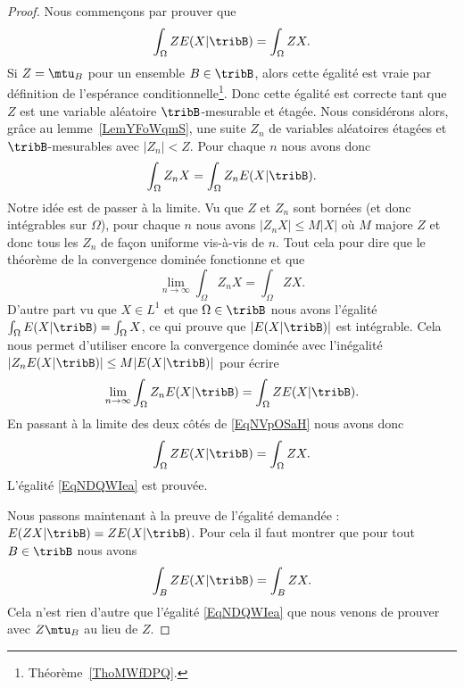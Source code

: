 \begin{proof}
	Nous commençons par prouver que
	\begin{equation}    \label{EqNDQWIea}
		\int_{\Omega}ZE(X|\tribB)=\int_{\Omega}ZX.
	\end{equation}
	Si \( Z=\mtu_B\) pour un ensemble \( B\in\tribB\), alors cette égalité est vraie par définition de l'espérance conditionnelle\footnote{Théorème~\ref{ThoMWfDPQ}.}. Donc cette égalité est correcte tant que \( Z\) est une variable aléatoire \( \tribB\)-mesurable et étagée. Nous considérons alors, grâce au lemme~\ref{LemYFoWqmS}, une suite \( Z_n\) de variables aléatoires étagées et \( \tribB\)-mesurables avec \( | Z_n |<Z\). Pour chaque \( n\) nous avons donc
	\begin{equation}    \label{EqNVpOSaH}
		\int_{\Omega}Z_nX=\int_{\Omega}Z_nE(X|\tribB).
	\end{equation}
	Notre idée est de passer à la limite. Vu que \( Z\) et \( Z_n\) sont bornées (et donc intégrables sur \( \Omega\)), pour chaque \( n\) nous avons \( | Z_nX |\leq M| X |\) où \( M\) majore \( Z\) et donc tous les \( Z_n\) de façon uniforme vis-à-vis de \( n\). Tout cela pour dire que le théorème de la convergence dominée fonctionne et que
	\begin{equation}
		\lim_{n\to \infty} \int_{\Omega}Z_nX=\int_{\Omega}ZX.
	\end{equation}
	D'autre part vu que \( X\in L^1\) et que \( \Omega\in\tribB\) nous avons l'égalité \( \int_{\Omega}E(X|\tribB)=\int_{\Omega}X\), ce qui prouve que \( | E(X|\tribB) | \) est intégrable. Cela nous permet d'utiliser encore la convergence dominée avec l'inégalité \( | Z_nE(X|\tribB) |\leq M| E(X|\tribB) |\) pour écrire
	\begin{equation}
		\lim_{n\to \infty} \int_{\Omega}Z_nE(X|\tribB)=\int_{\Omega}ZE(X|\tribB).
	\end{equation}
	En passant à la limite des deux côtés de \eqref{EqNVpOSaH} nous avons donc
	\begin{equation}
		\int_{\Omega}ZE(X|\tribB)=\int_{\Omega}ZX.
	\end{equation}
	L'égalité \eqref{EqNDQWIea} est prouvée.

	Nous passons maintenant à la preuve de l'égalité demandée : \( E(ZX|\tribB)=ZE(X|\tribB)\). Pour cela il faut montrer que pour tout \( B\in\tribB\) nous avons
	\begin{equation}
		\int_{B}ZE(X|\tribB)=\int_BZX.
	\end{equation}
	Cela n'est rien d'autre que l'égalité \eqref{EqNDQWIea} que nous venons de prouver avec \( Z\mtu_{B}\) au lieu de \( Z\).
\end{proof}

